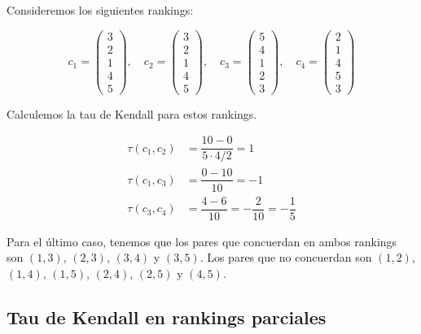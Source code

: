 \begin{ejemplo}
Consideremos los siguientes rankings:

\begin{equation*}
c_1 = \left( \begin{array}{c}
3\\
2\\
1\\
4\\
5
\end{array} \right), \quad
c_2 = \left( \begin{array}{c}
3\\
2\\
1\\
4\\
5
\end{array} \right), \quad
c_3 = \left( \begin{array}{c}
5\\
4\\
1\\
2\\
3
\end{array} \right), \quad
c_4 = \left( \begin{array}{c}
2\\
1\\
4\\
5\\
3
\end{array} \right)
\end{equation*}

Calculemos la tau de Kendall para estos rankings.

\begin{align*}
\tau(c_1, c_2) & = \dfrac{10 - 0}{5 \cdot 4/2} = 1\\
\tau(c_1, c_3) & = \dfrac{0 - 10}{10} = -1\\
\tau(c_3, c_4) & = \dfrac{4 -  6}{10} = -\dfrac{2}{10} = - \dfrac{1}{5}
\end{align*}

Para el último caso, tenemos que los pares que concuerdan en ambos rankings son $(1,3)$, $(2,3)$, $(3,4)$ y $(3,5)$. Los pares que no concuerdan son $(1,2)$, $(1,4)$, $(1,5)$, $(2,4)$, $(2,5)$ y $(4,5)$.

\end{ejemplo}

\subsection{Tau de Kendall en rankings parciales}

